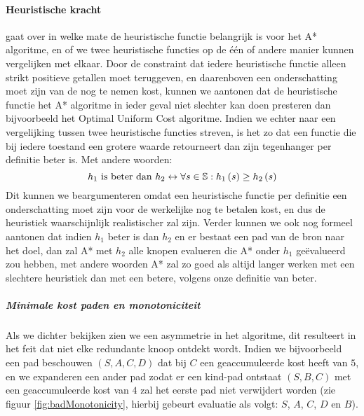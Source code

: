 \paragraph{Heuristische kracht}
 gaat over in welke mate de heuristische functie belangrijk is voor het A* algoritme, en of we twee heuristische functies op de \'e\'en of andere manier kunnen vergelijken met elkaar. Door de constraint dat iedere heuristische functie alleen strikt positieve getallen moet teruggeven, en daarenboven een onderschatting moet zijn van de nog te nemen kost, kunnen we aantonen dat de heuristische functie het A* algoritme in ieder geval niet slechter kan doen presteren dan bijvoorbeeld het Optimal Uniform Cost algoritme. Indien we echter naar een vergelijking tussen twee heuristische functies streven, is het zo dat een functie die bij iedere toestand een grotere waarde retourneert dan zijn tegenhanger per definitie beter is. Met andere woorden:
\begin{equation}
 h_1 \mbox{ is beter dan } h_2\leftrightarrow\forall s\in\mathbb{S}:h_1\left(s\right)\geq h_2\left(s\right)
\end{equation}
Dit kunnen we beargumenteren omdat een heuristische functie per definitie een onderschatting moet zijn voor de werkelijke nog te betalen kost, en dus de heuristiek waarschijnlijk realistischer zal zijn. Verder kunnen we ook nog formeel aantonen dat indien $h_1$ beter is dan $h_2$ en er bestaat een pad van de bron naar het doel, dan zal A* met $h_2$ alle knopen evalueren die A* onder $h_1$ ge\"evalueerd zou hebben, met andere woorden A* zal zo goed als altijd langer werken met een slechtere heuristiek dan met een betere, volgens onze definitie van beter.
\subparagraph{Minimale kost paden en monotoniciteit}
Als we  dichter bekijken zien we een asymmetrie in het algoritme, dit resulteert in het feit dat niet elke redundante knoop ontdekt wordt. Indien we bijvoorbeeld een pad beschouwen $\left(S,A,C,D\right)$ dat bij $C$ een geaccumuleerde kost heeft van $5$, en we expanderen een ander pad zodat er een kind-pad ontstaat $\left(S,B,C\right)$ met een geaccumuleerde kost van $4$ zal het eerste pad niet verwijdert worden (zie figuur \ref{fig:badMonotonicity}, hierbij gebeurt evaluatie als volgt: $S$, $A$, $C$, $D$ en $B$).

